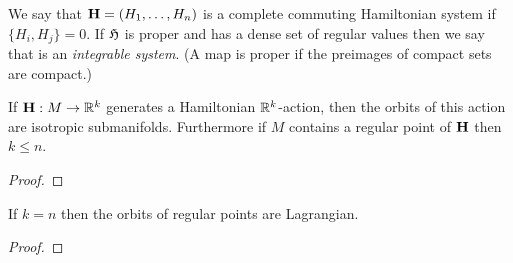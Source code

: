 
\begin{dfn}
    We say that $\mathbf{H}=(H_1,\ldots,H_n)$ is a complete commuting Hamiltonian system if $\{H_i,H_j\}=0$.
    If $\mathfrak{H}$ is proper and has a dense set of regular values then we say that is an \emph{integrable system}.
    (A map is proper if the preimages of compact sets are compact.)
\end{dfn}

\begin{lem}
    If $\mathbf{H}:M\to\mathbb{R}^k$ generates a Hamiltonian $\mathbb{R}^k$-action, then the orbits of this action are isotropic submanifolds.
    Furthermore if $M$ contains a regular point of $\mathbf{H}$ then $k\le n$.
\end{lem}

\begin{proof}
\end{proof}

\begin{cor}
    If $k=n$ then the orbits of regular points are Lagrangian.
\end{cor}

\begin{proof}
\end{proof}